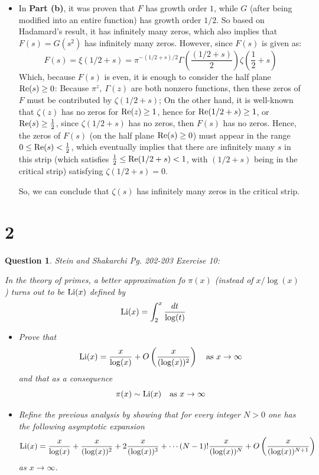\documentclass{article}
\newtheorem{question}{Question}
\begin{document}
\begin{itemize}
    \item[(c)] In \textbf{Part (b)}, it was proven that $F$ has growth order $1$, while $G$ (after being modified into an entire function) has growth order $1/2$. So based on Hadamard's result, it has infinitely many zeros, which also implies that $F(s)=G(s^2)$ has infinitely many zeros. However, since $F(s)$ is given as:
    $$F(s)=\xi(1/2+s) =  \pi^{-(1/2+s)/2}\Gamma\left(\frac{(1/2+s)}{2}\right)\zeta\left(\frac{1}{2}+s\right)$$
    Which, because $F(s)$ is even, it is enough to consider the half plane $\textmd{Re}(s)\geq 0$: Because $\pi^{z},\ \Gamma(z)$ are both nonzero functions, then these zeros of $F$ must be contributed by $\zeta(1/2+s)$; On the other hand, it is well-known that $\zeta(z)$ has no zeros for $\textmd{Re}(z)\geq 1$, hence for $\textmd{Re}(1/2+s)\geq 1$, or $\textmd{Re}(s)\geq \frac{1}{2}$, since $\zeta(1/2+s)$ has no zeros, then $F(s)$ has no zeros.
    Hence, the zeros of $F(s)$ (on the half plane $\textmd{Re}(s)\geq 0$) must appear in the range $0\leq \textmd{Re}(s) < \frac{1}{2}$, which eventually implies that there are infinitely many $s$ in this strip (which satisfies $\frac{1}{2}\leq \textmd{Re}(1/2+s)<1$, with $(1/2+s)$ being in the critical strip) satisfying $\zeta(1/2+s) = 0$. 

    So, we can conclude that $\zeta(s)$ has infinitely many zeros in the critical strip.
\end{itemize}

\break

\section*{2}
\begin{myBox}[]{}
    \begin{question}
        Stein and Shakarchi Pg. 202-203 Exercise 10:

        In the theory of primes, a better approximation fo $\pi(x)$ (instead of $x/\log(x)$) turns out to be $\textmd{Li}(x)$ defined by 
        $$\textmd{Li}(x)=\int_{2}^{x}\frac{dt}{\log(t)}$$
        \begin{itemize}
            \item[(a)] Prove that 
            $$\textmd{Li}(x)=\frac{x}{\log(x)}+O\left(\frac{x}{(\log(x))^2}\right)\quad \textmd{as }x\rightarrow\infty$$
            and that as a consequence 
            $$\pi(x)\sim \textmd{Li}(x)\quad \textmd{as }x\rightarrow\infty$$
            \item[(b)] Refine the previous analysis by showing that for every integer $N>0$ one has the following asymptotic expansion 
            $$\textmd{Li}(x)=\frac{x}{\log(x)}+\frac{x}{(\log(x))^2}+2\frac{x}{(\log(x))^3}+\cdots (N-1)!\frac{x}{(\log(x))^N}+O\left(\frac{x}{(\log(x))^{N+1}}\right)$$
            as $x\rightarrow\infty$.
        \end{itemize}
    \end{question}
\end{myBox}
\end{document}
